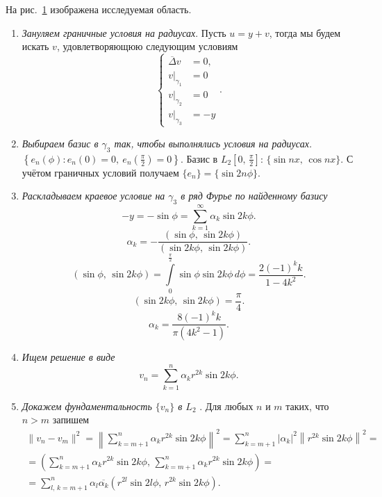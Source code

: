 \documentclass[a4paper]{article}
\begin{document}
\begin{sol}
На рис.~\ref{fig:1} изображена исследуемая область.
\begin{figure}[ht]
    \centering
    \caption{}
    \label{fig:1}
\end{figure}
\begin{enumerate}
\item \emph{Зануляем граничные условия на радиусах}. Пусть $u=y+v$, тогда мы будем искать $v$, удовлетворяющюю
	следующим условиям
\[
\left\{
\begin{aligned}
	\overline{\Delta} v&=0,\\
v|_{\gamma_1}&= 0 \\
v|_{\gamma_2}&= 0 \\
v|_{\gamma_3}&=-y
\end{aligned}
\right.
.\] 
\item \emph{Выбираем базис в $\gamma_3$ так, чтобы выполнялись
	условия на радиусах.} $\displaystyle \left\{e_n(\phi)\colon e_n(0)=0,\ e_n \left( \frac{\pi}{2} \right) =0\right\} $.
	Базис  в $\displaystyle L_2\left[0,\,\frac{\pi}{2}\right]$: $\{\sin nx,\, \cos nx\} $. С учётом граничных условий
получаем $\{e_n\} =\{\sin 2n \phi\} $.
\item  \emph{Раскладываем краевое условие на $\gamma_3$ в ряд Фурье
	по найденному базису}
\[
-y=-\sin \phi= \sum_{k=1}^{\infty} \alpha_k \sin 2k \phi
.\] 
\[
	\alpha_k= - \frac{(\sin \phi,\, \sin 2k\phi)}{
	(\sin 2k \phi,\, \sin 2k \phi)}
.\] 
\[
	(\sin \phi,\, \sin 2k \phi)=
	\int\limits_{0}^{\frac{\pi}{2}} \sin\phi \sin 2k \phi
	\, d\phi=
	\frac{2(-1)^k k}{1-4k^2}
.\] 
\[
	(\sin 2k \phi,\,\sin 2 k\phi)=\frac{\pi}{4}
.\] 
\[
	\alpha_k= \frac{8(-1)^k k}{\pi (4k^2-1)}
.\] 
\item \emph{Ищем решение в виде}
	\[
	v_n= \sum_{k=1}^{n} \alpha_k r^{2k}\sin 2k \phi
	.\] 
\item \emph{Докажем фундаментальность $\{ v_n\} $ в  $L_2$ }.
	Для любых $n$ и $m$ таких, что $n>m$ запишем
\begin{multline*}
\| v_n-v_m\|^2= \left\lVert \sum_{k=m+1}^{n} \alpha_k r^{2k}
\sin 2k\phi\right\rVert^2= \sum_{k=m+1}^{n} |\alpha_k|^2 \left\lVert r^{2k}\sin 2k \phi\right\rVert^2= \\=
\left( \sum_{k=m+1}^{n} \alpha_kr^{2k}\sin 2k\phi,\,\sum_{k=m+1}^{n} 
\alpha_k r^{2k} \sin 2k \phi\right) =\\=
\sum_{l,\,k=m+1}^{n} \alpha_l \overline{\alpha_k}\left( 
r^{2l} \sin 2l \phi,\, r^{2k} \sin 2k \phi\right) 
.\end{multline*} 

\end{enumerate}
\end{sol}
\end{document}
